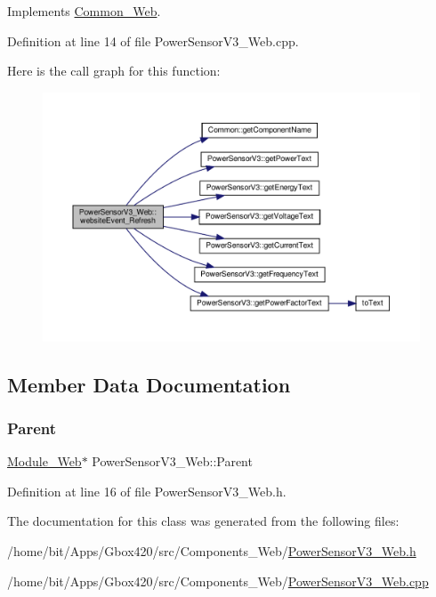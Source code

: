 Implements \hyperlink{class_common___web_aaca7c54fdcf908e4e1256b7b1f6fc212}{Common\+\_\+\+Web}.



Definition at line 14 of file Power\+Sensor\+V3\+\_\+\+Web.\+cpp.

Here is the call graph for this function\+:
\nopagebreak
\begin{figure}[H]
\begin{center}
\leavevmode
\includegraphics[width=350pt]{class_power_sensor_v3___web_aa5516c0a4c5daa0f27a89e86abb0db26_cgraph}
\end{center}
\end{figure}


\subsection{Member Data Documentation}
\mbox{\label{class_power_sensor_v3___web_a9449ff1f7a7ae15dbd2580ba297cf7ab}} 
\subsubsection{\texorpdfstring{Parent}{Parent}}
{\footnotesize\ttfamily \hyperlink{class_module___web}{Module\+\_\+\+Web}$\ast$ Power\+Sensor\+V3\+\_\+\+Web\+::\+Parent\hspace{0.3cm}{\ttfamily [protected]}}



Definition at line 16 of file Power\+Sensor\+V3\+\_\+\+Web.\+h.



The documentation for this class was generated from the following files\+:\begin{DoxyCompactItemize}
\item 
/home/bit/\+Apps/\+Gbox420/src/\+Components\+\_\+\+Web/\hyperlink{_power_sensor_v3___web_8h}{Power\+Sensor\+V3\+\_\+\+Web.\+h}\item 
/home/bit/\+Apps/\+Gbox420/src/\+Components\+\_\+\+Web/\hyperlink{_power_sensor_v3___web_8cpp}{Power\+Sensor\+V3\+\_\+\+Web.\+cpp}\end{DoxyCompactItemize}

